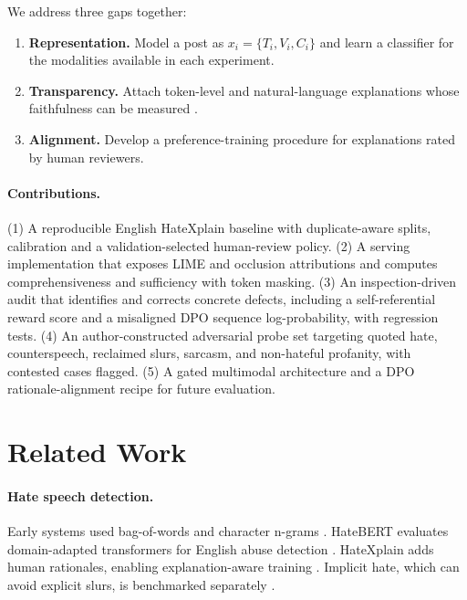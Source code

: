 \documentclass[11pt]{article}
\begin{document}
We address three gaps together:

\begin{enumerate}
    \item \textbf{Representation.} Model a post as \(x_i=\{T_i,V_i,C_i\}\) and learn a classifier for the modalities available in each experiment.
    \item \textbf{Transparency.} Attach token-level and natural-language explanations whose faithfulness can be measured \cite{ribeiro2016lime,jacovi2020faithfulness}.
    \item \textbf{Alignment.} Develop a preference-training procedure \cite{rafailov2023dpo} for explanations rated by human reviewers.
\end{enumerate}

\paragraph{Contributions.}
(1) A reproducible English HateXplain baseline with duplicate-aware splits, calibration and a validation-selected human-review policy.
(2) A serving implementation that exposes LIME and occlusion attributions and computes comprehensiveness and sufficiency with token masking.
(3) An inspection-driven audit that identifies and corrects concrete defects, including a self-referential reward score and a misaligned DPO sequence log-probability, with regression tests.
(4) An author-constructed adversarial probe set targeting quoted hate, counterspeech, reclaimed slurs, sarcasm, and non-hateful profanity, with contested cases flagged.
(5) A gated multimodal architecture and a DPO rationale-alignment recipe for future evaluation.

\section{Related Work}

\paragraph{Hate speech detection.}
Early systems used bag-of-words and character n-grams \cite{davidson2017hate,zampieri2019olid}. HateBERT evaluates domain-adapted transformers for English abuse detection \cite{caselli2021hatebert}. HateXplain adds human rationales, enabling explanation-aware training \cite{mathew2021hatexplain}. Implicit hate, which can avoid explicit slurs, is benchmarked separately \cite{elsherief2021latent}.
\end{document}

